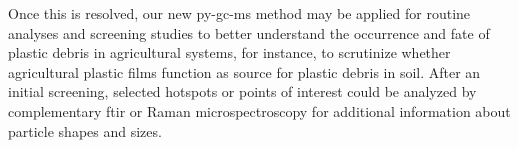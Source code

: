 Once this is resolved, our new \ac{py-gc-ms} method may be applied for routine analyses and screening studies to better understand the occurrence and fate of plastic debris in agricultural systems, for instance, to scrutinize whether agricultural plastic films function as source for plastic debris in soil. After an initial screening, selected hotspots or points of interest could be analyzed by complementary \ac{ftir} or Raman microspectroscopy for additional information about particle shapes and sizes.
